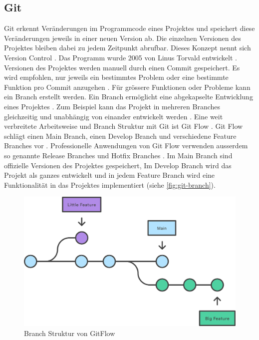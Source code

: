 \subsection{Git}\label{sub:t_git_git} Git erkennt Veränderungen im Programmcode eines
Projektes und speichert diese Veränderungen jeweils in einer neuen Version ab. Die
einzelnen Versionen des Projektes bleiben dabei zu jedem Zeitpunkt abrufbar.
Dieses Konzept nennt sich Version Control
\cite{atlassian_what_nodate}. Das Programm wurde 2005 von Linus
Torvald entwickelt \cite{noauthor_git_2021}. Versionen des Projektes werden
manuell durch einen Commit gespeichert. Es wird empfohlen, nur jeweils ein
bestimmtes Problem oder eine bestimmte Funktion pro Commit anzugehen
\cite{noauthor_5_nodate}. Für grössere Funktionen oder Probleme kann ein Branch
erstellt werden. Ein Branch ermöglicht eine abgekapselte Entwicklung eines
Projektes \cite{guillermo_brachetta_what_2022}. Zum Beispiel kann das Projekt in
mehreren Branches gleichzeitig und unabhängig von einander entwickelt werden
\cite{guillermo_brachetta_what_2022}. Eine weit verbreitete Arbeitsweise und
Branch Struktur mit Git ist Git Flow
\cite{noauthor_what_2022}\cite{atlassian_git-flow-workflow_nodate}. Git Flow
schlägt einen Main Branch, einen Develop Branch und verschiedene
Feature Branches vor \cite{atlassian_git-flow-workflow_nodate}. Professionelle
Anwendungen von Git Flow verwenden ausserdem so genannte Release Branches und
Hotfix Branches \cite{cameron_mckenzie_gitflow_2021}. Im Main Branch sind
offizielle Versionen des Projektes gespeichert, Im Develop Branch wird das
Projekt als ganzes entwickelt und in jedem Feature Branch wird eine
Funktionalität in das Projektes implementiert (siehe \autoref{fig:git-branch}). 

\begin{figure}[!ht]
    \centering
    \includegraphics[width=\textwidth-2cm]{images/theorie/git-branch.png}
    \caption{Branch Struktur von GitFlow \cite{atlassian_git-flow-workflow_nodate}}
    \label{fig:git-branch}
\end{figure}

